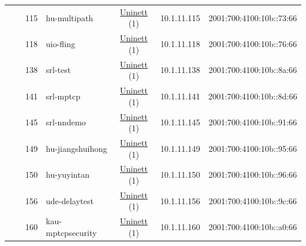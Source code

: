 \begin{small}
\begin{center}
\begin{longtable}{|c|c|c|c|c|c|c|c|}
  &  & \tiny{115} & \multicolumn{1}{|l|}{\tiny{hu-multipath}} & \multicolumn{2}{|c|}{\tiny{\href{https://www.uninett.no}{Uninett} (1)}} & \tiny{10.1.11.115} & \tiny{2001:700:4100:10b::73:66} \\* \cline{3-3}\cline{4-4}\cline{5-5}\cline{6-6}\cline{7-7}\cline{8-8}
  &  & \tiny{118} & \multicolumn{1}{|l|}{\tiny{uio-fling}} & \multicolumn{2}{|c|}{\tiny{\href{https://www.uninett.no}{Uninett} (1)}} & \tiny{10.1.11.118} & \tiny{2001:700:4100:10b::76:66} \\* \cline{3-3}\cline{4-4}\cline{5-5}\cline{6-6}\cline{7-7}\cline{8-8}
  &  & \tiny{138} & \multicolumn{1}{|l|}{\tiny{srl-test}} & \multicolumn{2}{|c|}{\tiny{\href{https://www.uninett.no}{Uninett} (1)}} & \tiny{10.1.11.138} & \tiny{2001:700:4100:10b::8a:66} \\* \cline{3-3}\cline{4-4}\cline{5-5}\cline{6-6}\cline{7-7}\cline{8-8}
  &  & \tiny{141} & \multicolumn{1}{|l|}{\tiny{srl-mptcp}} & \multicolumn{2}{|c|}{\tiny{\href{https://www.uninett.no}{Uninett} (1)}} & \tiny{10.1.11.141} & \tiny{2001:700:4100:10b::8d:66} \\* \cline{3-3}\cline{4-4}\cline{5-5}\cline{6-6}\cline{7-7}\cline{8-8}
  &  & \tiny{145} & \multicolumn{1}{|l|}{\tiny{srl-nndemo}} & \multicolumn{2}{|c|}{\tiny{\href{https://www.uninett.no}{Uninett} (1)}} & \tiny{10.1.11.145} & \tiny{2001:700:4100:10b::91:66} \\* \cline{3-3}\cline{4-4}\cline{5-5}\cline{6-6}\cline{7-7}\cline{8-8}
  &  & \tiny{149} & \multicolumn{1}{|l|}{\tiny{hu-jiangshuihong}} & \multicolumn{2}{|c|}{\tiny{\href{https://www.uninett.no}{Uninett} (1)}} & \tiny{10.1.11.149} & \tiny{2001:700:4100:10b::95:66} \\* \cline{3-3}\cline{4-4}\cline{5-5}\cline{6-6}\cline{7-7}\cline{8-8}
  &  & \tiny{150} & \multicolumn{1}{|l|}{\tiny{hu-yuyintan}} & \multicolumn{2}{|c|}{\tiny{\href{https://www.uninett.no}{Uninett} (1)}} & \tiny{10.1.11.150} & \tiny{2001:700:4100:10b::96:66} \\* \cline{3-3}\cline{4-4}\cline{5-5}\cline{6-6}\cline{7-7}\cline{8-8}
  &  & \tiny{156} & \multicolumn{1}{|l|}{\tiny{ude-delaytest}} & \multicolumn{2}{|c|}{\tiny{\href{https://www.uninett.no}{Uninett} (1)}} & \tiny{10.1.11.156} & \tiny{2001:700:4100:10b::9c:66} \\* \cline{3-3}\cline{4-4}\cline{5-5}\cline{6-6}\cline{7-7}\cline{8-8}
  &  & \tiny{160} & \multicolumn{1}{|l|}{\tiny{kau-mptcpsecurity}} & \multicolumn{2}{|c|}{\tiny{\href{https://www.uninett.no}{Uninett} (1)}} & \tiny{10.1.11.160} & \tiny{2001:700:4100:10b::a0:66} \\* \cline{3-3}\cline{4-4}\cline{5-5}\cline{6-6}\cline{7-7}\cline{8-8}

\end{longtable}
\end{center}
\end{small}
